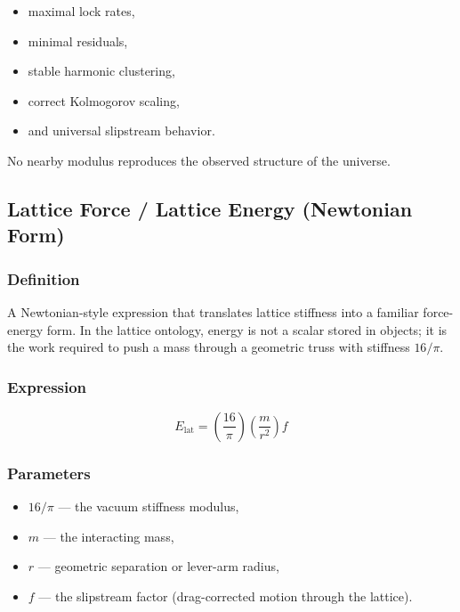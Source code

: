 \documentclass[12pt,oneside]{book}
\begin{document}
\begin{itemize}
    \item maximal lock rates,
    \item minimal residuals,
    \item stable harmonic clustering,
    \item correct Kolmogorov scaling,
    \item and universal slipstream behavior.
\end{itemize}

No nearby modulus reproduces the observed structure of the universe.


\subsection{Lattice Force / Lattice Energy (Newtonian Form)}

\subsubsection{Definition}
A Newtonian-style expression that translates lattice stiffness into a familiar force-energy form.
In the lattice ontology, energy is not a scalar stored in objects; it is the work required to push
a mass through a geometric truss with stiffness $16/\pi$.

\subsubsection{Expression}


\[
E_{\mathrm{lat}} = \left(\frac{16}{\pi}\right)\left(\frac{m}{r^2}\right) f
\]



\subsubsection{Parameters}
\begin{itemize}
    \item $16/\pi$ — the vacuum stiffness modulus,
    \item $m$ — the interacting mass,
    \item $r$ — geometric separation or lever-arm radius,
    \item $f$ — the slipstream factor (drag-corrected motion through the lattice).
\end{itemize}
\end{document}
